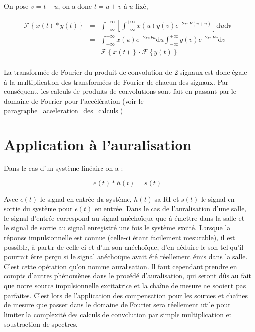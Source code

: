 On pose $v= t- u$, on a donc $t= u+v$ à $u$ fixé,

\begin{eqnarray*}
    \mathcal{F}\left\{x(t) \ast y(t)\right\} & = & \int_{-\infty}^{+\infty}  \left[ \int_{-\infty}^{+\infty} x(u)y(v)  e^{-2i\pi F(v+u)} \right] \mathrm du \mathrm dv\\
    & = & \int_{-\infty}^{+\infty}  x(u) e^{-2i\pi Fu}  \mathrm du
    \int_{-\infty}^{+\infty} y(v) e^{-2i\pi Fv} \mathrm dv \\
    & = & \mathcal{F}\left\{x(t)\right\}\cdot\mathcal{F}\left\{y(t)\right\} \\
\end{eqnarray*}

La transformée de Fourier du produit de convolution de 2 signaux est donc égale à la multiplication des transformées de Fourier de chacun des signaux.
Par conséquent, les calculs de produits de convolutions sont fait en passant par le domaine de Fourier pour l'accélération (voir le paragraphe~\ref{acceleration_des_calculs})


\section{Application à l'auralisation} %

Dans le cas d'un système linéaire on a :

\begin{equation}
e(t) \ast h(t) = s(t)
\end{equation}

Avec $e(t)$ le signal en entrée du système, $h(t)$ sa RI et $s(t)$ le signal en sortie du système pour $e(t)$ en entrée.
Dans le cas de l'auralisation d'une salle, le signal d'entrée correspond au signal anéchoïque que à émettre dans la salle et le signal de sortie au signal enregistré une fois le système excité.
Lorsque la réponse impulsionnelle est connue (celle-ci étant facilement mesurable), il est possible, à partir de celle-ci et d'un son anéchoïque, d'en déduire le son tel qu'il pourrait être perçu si le signal anéchoïque avait été réellement émis dans la salle. C'est cette opération qu'on nomme auralisation.
Il faut cependant prendre en compte d'autres phénomènes dans le procédé d'auralisation, qui seront dûs au fait que notre source impulsionnelle excitatrice et la chaîne de mesure ne sooient pas parfaites.
C'est lors de l'application des compensation pour les sources et chaînes de mesure que passer dans le domaine de Fourier sera réellement utile pour limiter la complexité des calculs de convolution par simple multiplication et soustraction de spectres.
